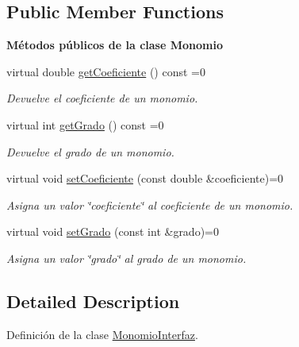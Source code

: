 \subsection*{Public Member Functions}
\begin{Indent}{\bf Métodos públicos de la clase Monomio}\par
\begin{DoxyCompactItemize}
\item 
virtual double \hyperlink{classed_1_1MonomioInterfaz_a8dade5810b660860408169bca4b35e2e}{get\-Coeficiente} () const =0
\begin{DoxyCompactList}\small\item\em Devuelve el coeficiente de un monomio. \end{DoxyCompactList}\item 
virtual int \hyperlink{classed_1_1MonomioInterfaz_aa5b87185650a82784b39b9bbbaec7dcb}{get\-Grado} () const =0
\begin{DoxyCompactList}\small\item\em Devuelve el grado de un monomio. \end{DoxyCompactList}\item 
virtual void \hyperlink{classed_1_1MonomioInterfaz_a40ba6a0dc0940f60842a319f982aac6d}{set\-Coeficiente} (const double \&coeficiente)=0
\begin{DoxyCompactList}\small\item\em Asigna un valor \char`\"{}coeficiente\char`\"{} al coeficiente de un monomio. \end{DoxyCompactList}\item 
virtual void \hyperlink{classed_1_1MonomioInterfaz_a7294c2a6a1c76ef374202e45f54f1da6}{set\-Grado} (const int \&grado)=0
\begin{DoxyCompactList}\small\item\em Asigna un valor \char`\"{}grado\char`\"{} al grado de un monomio. \end{DoxyCompactList}\end{DoxyCompactItemize}
\end{Indent}


\subsection{Detailed Description}
Definición de la clase \hyperlink{classed_1_1MonomioInterfaz}{Monomio\-Interfaz}. 

